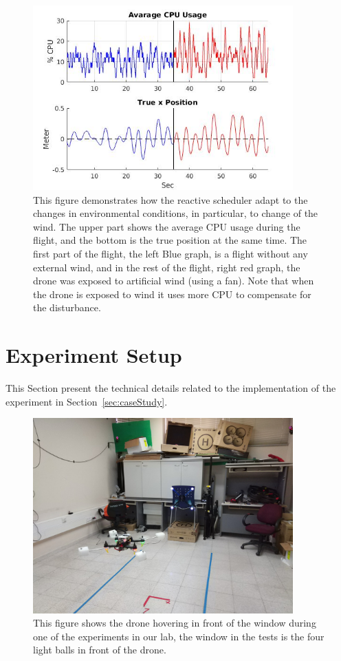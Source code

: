\documentclass[ twoside, 12pt ]{article}
\begin{document}
\begin{figure} %
    \centerline{\includegraphics[width=100mm]{windPlot15.jpg}}
    \caption{This figure demonstrates how the reactive scheduler adapt to the changes in environmental conditions, in particular, to change of the wind. The upper part shows the average CPU usage during the flight, and the bottom is the true position at the same time. The first part of the flight, the left Blue graph, is a flight without any external wind, and in the rest of the flight, right red graph, the drone was exposed to artificial wind (using a fan). Note that when the drone is exposed to wind it uses more CPU to compensate for the disturbance.}
    \label{fig:windPlot}
\end{figure}

\section{Experiment Setup}
\label{sec:Experiment setup}

This Section present the technical details related to the implementation of the experiment in Section~\ref{sec:caseStudy}.

\begin{figure} %
    \centerline{\includegraphics[width=100mm]{hover_in_lab.jpg}}
    \caption{This figure shows the drone hovering in front of the window during one of the experiments in our lab, the window in the tests is the four light balls in front of the drone.}
    \label{fig:hover_in_lab}
\end{figure}
\end{document}
